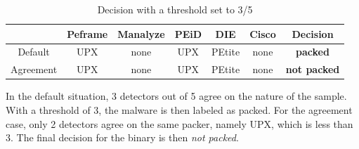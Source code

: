 \begin{itemize}
    \begin{table}[H]
    \centering
    \begin{tabular}{|c|c|c|c|c|c|c|}
    \hline
     & Peframe & Manalyze & PEiD & DIE & Cisco & Decision \\
    \hline
     Default & UPX & none & UPX & PEtite & none & \textbf{packed} \\
     Agreement & UPX & none & UPX & PEtite & none & \textbf{not packed} \\
    \hline
    \end{tabular}
    \captionsetup{justification=centering}
    \caption{Decision with a threshold set to 3/5}
    \label{fig:agreement}
    \end{table}
    In the default situation, 3 detectors out of 5 agree on the nature of the sample. With a threshold of 3, the malware is then labeled as packed. For the agreement case, only 2 detectors agree on the same packer, namely UPX, which is less than 3. The final decision for the binary is then \textit{not packed}.
    

\end{itemize}
